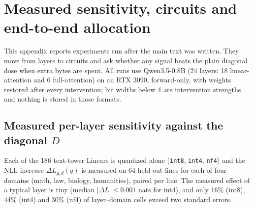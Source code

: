 \documentclass[11pt]{article}
\newcommand{\code}[1]{\texttt{#1}}
\begin{document}
\section{Measured sensitivity, circuits and end-to-end allocation}
\label{app:circuits}

This appendix reports experiments run after the main text was written. They move from layers to circuits and ask
whether any signal beats the plain diagonal dose when extra bytes are spent. All runs use Qwen3.5-0.8B
(24 layers: 18 linear-attention and 6 full-attention) on an RTX 3090, forward-only, with weights restored after every
intervention; bit widths below 4 are intervention strengths and nothing is stored in those formats.

\subsection{Measured per-layer sensitivity against the diagonal $D$}
Each of the 186 text-tower Linears is quantized alone (\code{int8}, \code{int4}, \code{nf4}) and the NLL increase
$\Delta L_{g,d}(q)$ is measured on 64 held-out lines for each of four domains (math, law, biology, humanities), paired per line.
The measured effect of a typical layer is tiny (median $|\Delta L|\le 0.001$ nats for int4), and only 16\% (int8), 44\% (int4) and 30\% (nf4)
of layer--domain cells exceed two standard errors.
\end{document}
